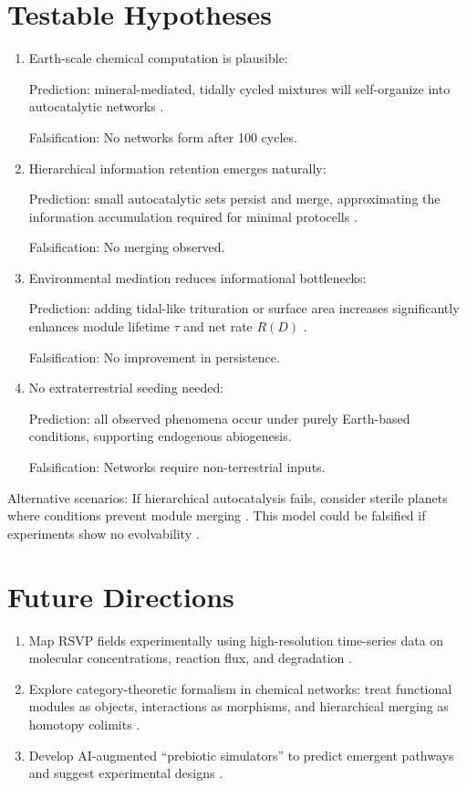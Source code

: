 \documentclass[openany]{book}
\begin{document}
\section{Testable Hypotheses}
\begin{enumerate}
\item Earth-scale chemical computation is plausible:

Prediction: mineral-mediated, tidally cycled mixtures will self-organize into autocatalytic networks \citep{plum2025}.

Falsification: No networks form after 100 cycles.

\item Hierarchical information retention emerges naturally:

Prediction: small autocatalytic sets persist and merge, approximating the information accumulation required for minimal protocells \citep{sokolskyi2024}.

Falsification: No merging observed.

\item Environmental mediation reduces informational bottlenecks:

Prediction: adding tidal-like trituration or surface area increases significantly enhances module lifetime $\tau$ and net rate $R(D)$ \citep{matreux2024}.

Falsification: No improvement in persistence.

\item No extraterrestrial seeding needed:

Prediction: all observed phenomena occur under purely Earth-based conditions, supporting endogenous abiogenesis.

Falsification: Networks require non-terrestrial inputs.
\end{enumerate}

Alternative scenarios: If hierarchical autocatalysis fails, consider sterile planets where conditions prevent module merging \citep{martin2015}. This model could be falsified if experiments show no evolvability \citep{vasas2010}.

\section{Future Directions}
\begin{enumerate}
\item Map RSVP fields experimentally using high-resolution time-series data on molecular concentrations, reaction flux, and degradation \citep{sokolskyi2024}.
\item Explore category-theoretic formalism in chemical networks: treat functional modules as objects, interactions as morphisms, and hierarchical merging as homotopy colimits \citep{steel2013}.
\item Develop AI-augmented “prebiotic simulators” to predict emergent pathways and suggest experimental designs \citep{scalinghypothesis}.
\end{enumerate}
\end{document}
